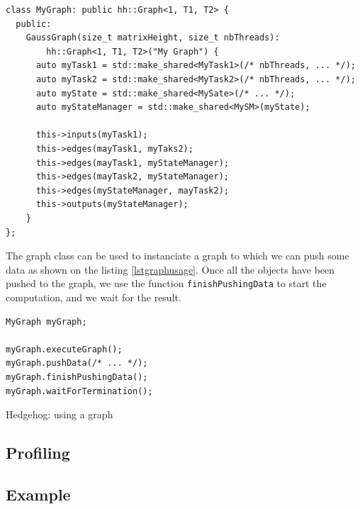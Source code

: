 \begin{listing}[ht!]
\begin{verbatim}
class MyGraph: public hh::Graph<1, T1, T2> {
  public:
    GaussGraph(size_t matrixHeight, size_t nbThreads):
        hh::Graph<1, T1, T2>("My Graph") {
      auto myTask1 = std::make_shared<MyTask1>(/* nbThreads, ... */);
      auto myTask2 = std::make_shared<MyTask2>(/* nbThreads, ... */);
      auto myState = std::make_shared<MySate>(/* ... */);
      auto myStateManager = std::make_shared<MySM>(myState);

      this->inputs(myTask1);
      this->edges(mayTask1, myTaks2);
      this->edges(mayTask1, myStateManager);
      this->edges(mayTask2, myStateManager);
      this->edges(myStateManager, mayTask2);
      this->outputs(myStateManager);
    }
};
\end{verbatim}
\label{lst:graph}
\end{listing}

The graph class can be used to instanciate a graph to which we can push some
data as shown on the listing \ref{lstgraphusage}. Once all the objects have been
pushed to the graph, we use the function \texttt{finishPushingData} to start the
computation, and we wait for the result.

\begin{listing}[ht!]
\begin{verbatim}
MyGraph myGraph;

myGraph.executeGraph();
myGraph.pushData(/* ... */);
myGraph.finishPushingData();
myGraph.waitForTermination();
\end{verbatim}
\caption{Hedgehog: using a graph}
\label{lst:graphusage}
\end{listing}

\subsection{Profiling}


\subsection{Example}
